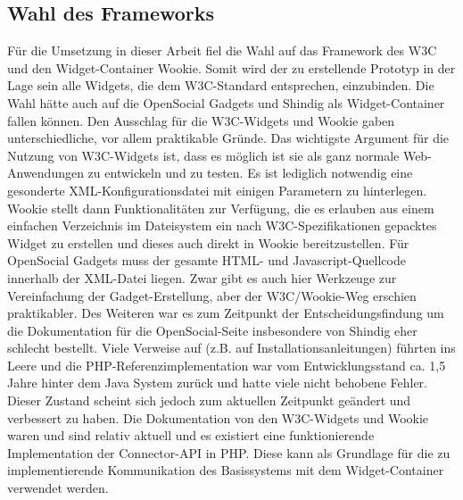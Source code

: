 \subsection{Wahl des Frameworks}
Für die Umsetzung in dieser Arbeit fiel die Wahl auf das Framework des W3C und den Widget-Container Wookie. Somit wird der zu erstellende Prototyp in der Lage sein alle Widgets, die dem W3C-Standard entsprechen, einzubinden. Die Wahl hätte auch auf die OpenSocial Gadgets und Shindig als Widget-Container fallen können. Den Ausschlag für die W3C-Widgets und Wookie gaben unterschiedliche, vor allem praktikable Gründe. Das wichtigste Argument für die Nutzung von W3C-Widgets ist, dass es möglich ist sie als ganz normale Web-Anwendungen zu entwickeln und zu testen. Es ist lediglich notwendig eine gesonderte XML-Konfigurationsdatei mit einigen Parametern zu hinterlegen. Wookie stellt dann Funktionalitäten zur Verfügung, die es erlauben aus einem einfachen Verzeichnis im Dateisystem ein nach W3C-Spezifikationen gepacktes Widget zu erstellen und dieses auch direkt in Wookie bereitzustellen. Für OpenSocial Gadgets muss der gesamte HTML- und Javascript-Quellcode innerhalb der XML-Datei liegen. Zwar gibt es auch hier Werkzeuge zur Vereinfachung der Gadget-Erstellung, aber der W3C/Wookie-Weg erschien praktikabler. Des Weiteren war es zum Zeitpunkt der Entscheidungsfindung um die Dokumentation für die OpenSocial-Seite insbesondere von Shindig eher schlecht bestellt. Viele Verweise auf (z.B. auf Installationsanleitungen) führten ins Leere und die PHP-Referenzimplementation war vom Entwicklungsstand ca. 1,5 Jahre hinter dem Java System zurück und hatte viele nicht behobene Fehler. Dieser Zustand scheint sich jedoch zum aktuellen Zeitpunkt geändert und verbessert zu haben. Die Dokumentation von den W3C-Widgets und Wookie waren und sind relativ aktuell und es existiert eine funktionierende Implementation der Connector-API in PHP. Diese kann als Grundlage für die zu implementierende Kommunikation des Basissystems mit dem Widget-Container verwendet werden.

